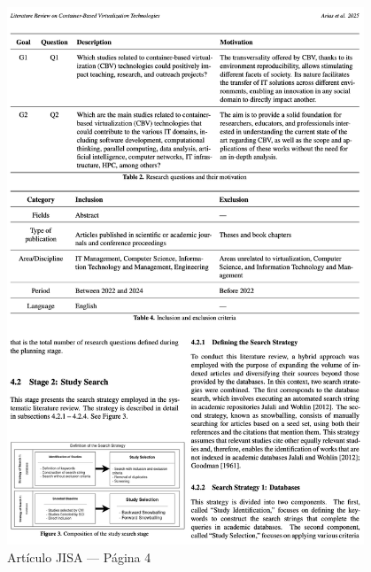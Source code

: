 \begin{figure}[H]
	\centering
	\begin{tcolorbox}[
			colback=white,
			colframe=gray!50,
			boxrule=1pt,
			arc=2pt,
			boxsep=5pt,
			left=3pt,
			right=3pt,
			top=3pt,
			bottom=3pt,
			drop shadow
		]
		\includegraphics[width=0.95\textwidth,keepaspectratio]{apendices/JISA/pagina_4.png}
	\end{tcolorbox}
	\caption{Artículo JISA --- Página 4}\label{fig:jisa-pagina-4}
\end{figure}
\FloatBarrier%

